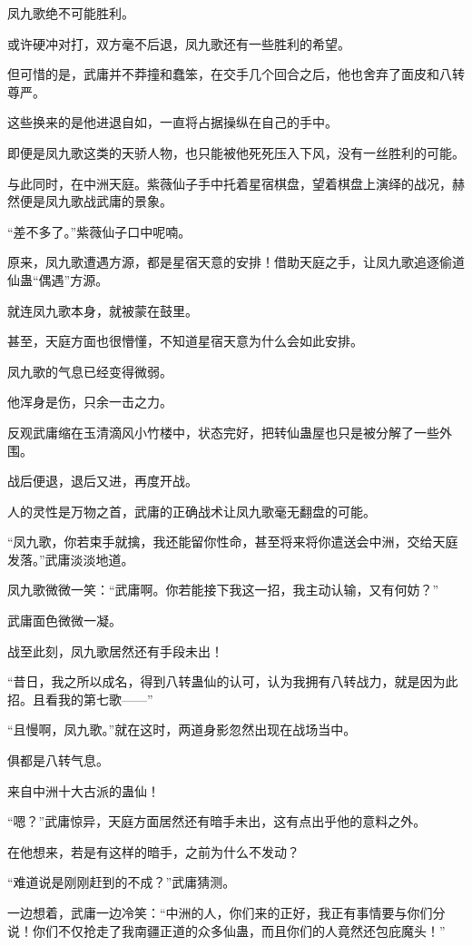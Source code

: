 \begin{this_body}
凤九歌绝不可能胜利。

或许硬冲对打，双方毫不后退，凤九歌还有一些胜利的希望。

但可惜的是，武庸并不莽撞和蠢笨，在交手几个回合之后，他也舍弃了面皮和八转尊严。

这些换来的是他进退自如，一直将占据操纵在自己的手中。

即便是凤九歌这类的天骄人物，也只能被他死死压入下风，没有一丝胜利的可能。

与此同时，在中洲天庭。紫薇仙子手中托着星宿棋盘，望着棋盘上演绎的战况，赫然便是凤九歌战武庸的景象。

“差不多了。”紫薇仙子口中呢喃。

原来，凤九歌遭遇方源，都是星宿天意的安排！借助天庭之手，让凤九歌追逐偷道仙蛊“偶遇”方源。

就连凤九歌本身，就被蒙在鼓里。

甚至，天庭方面也很懵懂，不知道星宿天意为什么会如此安排。

凤九歌的气息已经变得微弱。

他浑身是伤，只余一击之力。

反观武庸缩在玉清滴风小竹楼中，状态完好，把转仙蛊屋也只是被分解了一些外围。

战后便退，退后又进，再度开战。

人的灵性是万物之首，武庸的正确战术让凤九歌毫无翻盘的可能。

“凤九歌，你若束手就擒，我还能留你性命，甚至将来将你遣送会中洲，交给天庭发落。”武庸淡淡地道。

凤九歌微微一笑：“武庸啊。你若能接下我这一招，我主动认输，又有何妨？”

武庸面色微微一凝。

战至此刻，凤九歌居然还有手段未出！

“昔日，我之所以成名，得到八转蛊仙的认可，认为我拥有八转战力，就是因为此招。且看我的第七歌——”

“且慢啊，凤九歌。”就在这时，两道身影忽然出现在战场当中。

俱都是八转气息。

来自中洲十大古派的蛊仙！

“嗯？”武庸惊异，天庭方面居然还有暗手未出，这有点出乎他的意料之外。

在他想来，若是有这样的暗手，之前为什么不发动？

“难道说是刚刚赶到的不成？”武庸猜测。

一边想着，武庸一边冷笑：“中洲的人，你们来的正好，我正有事情要与你们分说！你们不仅抢走了我南疆正道的众多仙蛊，而且你们的人竟然还包庇魔头！”


\end{this_body}
